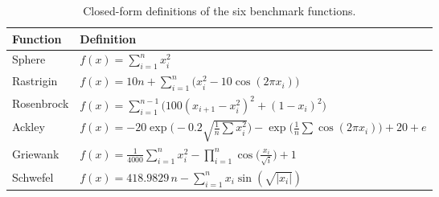 \documentclass[11pt]{article}
\begin{document}
\begin{table}[h]
\centering
\small
\begin{tabular}{ll}
\toprule
Function & Definition \\
\midrule
Sphere & $f(x) = \sum_{i=1}^{n} x_i^2$ \\[4pt]
Rastrigin & $f(x) = 10n + \sum_{i=1}^{n}\big(x_i^2 - 10\cos(2\pi x_i)\big)$ \\[4pt]
Rosenbrock & $f(x) = \sum_{i=1}^{n-1}\big(100(x_{i+1}-x_i^2)^2 + (1-x_i)^2\big)$ \\[4pt]
Ackley & $f(x) = -20\exp\!\big(-0.2\sqrt{\tfrac{1}{n}\sum x_i^2}\big) - \exp\!\big(\tfrac{1}{n}\sum\cos(2\pi x_i)\big) + 20 + e$ \\[4pt]
Griewank & $f(x) = \tfrac{1}{4000}\sum_{i=1}^{n} x_i^2 - \prod_{i=1}^{n}\cos\!\big(\tfrac{x_i}{\sqrt{i}}\big) + 1$ \\[4pt]
Schwefel & $f(x) = 418.9829\,n - \sum_{i=1}^{n} x_i\sin(\sqrt{|x_i|})$ \\
\bottomrule
\end{tabular}
\caption{Closed-form definitions of the six benchmark functions.}
\label{tab:defs}
\vspace{-0.5em}
\end{table}
\end{document}
